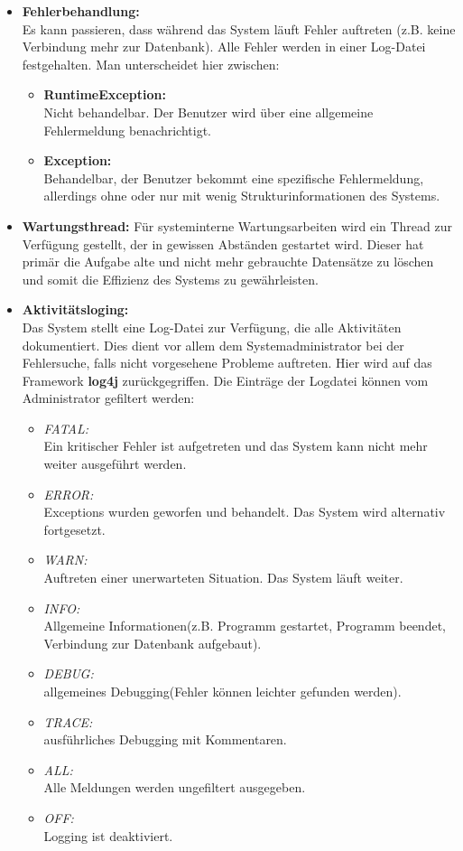 \begin{itemize}
			\item \textbf{Fehlerbehandlung:} \\
			Es kann passieren, dass während das System läuft Fehler auftreten (z.B. keine Verbindung mehr zur Datenbank). Alle Fehler werden in einer Log-Datei festgehalten. Man unterscheidet hier zwischen:
			\begin{itemize}
				\item \textbf{RuntimeException:}\\
				 Nicht behandelbar. Der Benutzer wird über eine allgemeine Fehlermeldung benachrichtigt.
				\item \textbf{Exception:} \\
				Behandelbar, der Benutzer bekommt eine spezifische Fehlermeldung, allerdings ohne oder nur mit wenig Strukturinformationen des Systems.
				\end{itemize}
			
			\item \textbf{Wartungsthread:}
			Für systeminterne Wartungsarbeiten wird ein Thread zur Verfügung gestellt, der in gewissen Abständen gestartet wird. Dieser hat primär die Aufgabe alte und nicht mehr gebrauchte Datensätze zu löschen und somit die Effizienz des Systems zu gewährleisten.
			
			\item \textbf{Aktivitätsloging:}\\
			Das System stellt eine Log-Datei zur Verfügung, die alle Aktivitäten dokumentiert. Dies dient vor allem dem Systemadministrator bei der Fehlersuche, falls nicht vorgesehene Probleme auftreten. Hier wird auf das Framework \textbf{log4j} zurückgegriffen. Die Einträge der Logdatei können vom Administrator gefiltert werden:
			\begin{itemize}
				\item \emph{FATAL:}\\
				Ein kritischer Fehler ist aufgetreten und das System kann nicht mehr weiter ausgeführt werden.
				\item \emph{ERROR:}\\
				Exceptions wurden geworfen und behandelt. Das System wird alternativ fortgesetzt.
				\item \emph{WARN:}\\
				Auftreten einer unerwarteten Situation. Das System läuft weiter.
				\item \emph{INFO:}\\
				Allgemeine Informationen(z.B. Programm gestartet, Programm beendet, Verbindung zur Datenbank aufgebaut).
				\item \emph{DEBUG:}\\
				allgemeines Debugging(Fehler können leichter gefunden werden).
				\item \emph{TRACE:}\\
				ausführliches Debugging mit Kommentaren.
				\item \emph{ALL:}\\
				Alle Meldungen werden ungefiltert ausgegeben.
				\item \emph{OFF:}\\
				Logging ist deaktiviert.
			\end{itemize}
			

\end{itemize}
